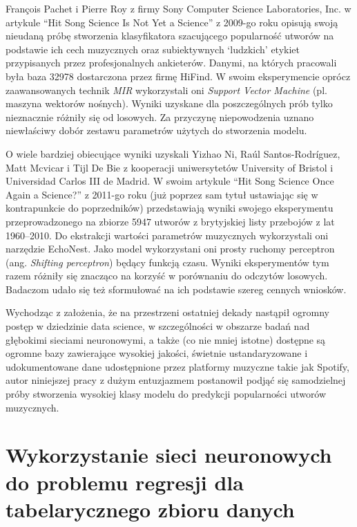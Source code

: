 \documentclass[a4paper,12pt]{article}
\numberwithin{figure}{section}
\begin{document}
    \bigskip

    François Pachet i Pierre Roy z firmy Sony Computer Science Laboratories, Inc. w artykule ``Hit Song Science Is Not Yet a Science'' z 2009-go roku\cite{HitSongScienceNotYet2009} opisują swoją nieudaną próbę stworzenia klasyfikatora szacującego popularność utworów na podstawie ich cech muzycznych oraz subiektywnych `ludzkich' etykiet przypisanych przez profesjonalnych ankieterów. Danymi, na których pracowali była baza 32978 dostarczona przez firmę HiFind. W swoim eksperymencie oprócz zaawansowanych technik \textit{MIR} wykorzystali oni \textit{Support Vector Machine} (pl. maszyna wektorów nośnych). Wyniki uzyskane dla poszczególnych prób tylko nieznacznie różniły się od losowych. Za przyczynę niepowodzenia uznano niewłaściwy dobór zestawu parametrów użytych do stworzenia modelu.

    \bigskip

    O wiele bardziej obiecujące wyniki uzyskali Yizhao Ni, Raúl Santos-Rodríguez, Matt Mcvicar i Tijl De Bie z kooperacji uniwersytetów University of Bristol i Universidad Carlos III de Madrid. W swoim artykule ``Hit Song Science Once Again a Science?'' z 2011-go roku\cite{HitSongScienceOnceAgain2011} (już poprzez sam tytuł ustawiając się w kontrapunkcie do poprzedników) przedstawiają wyniki swojego eksperymentu przeprowadzonego na zbiorze 5947 utworów z brytyjskiej listy przebojów z lat 1960--2010. Do ekstrakcji wartości parametrów muzycznych wykorzystali oni narzędzie EchoNest. Jako model wykorzystani oni prosty ruchomy perceptron (ang. \textit{Shifting perceptron}) będący funkcją czasu. Wyniki eksperymentów tym razem różniły się znacząco na korzyść w porównaniu do odczytów losowych. Badaczom udało się też sformułować na ich podstawie szereg cennych wniosków.

    \bigskip

    Wychodząc z założenia, że na przestrzeni ostatniej dekady nastąpił ogromny postęp w dziedzinie data science, w szczególności w obszarze badań nad głębokimi sieciami neuronowymi, a także (co nie mniej istotne) dostępne są ogromne bazy zawierające wysokiej jakości, świetnie ustandaryzowane i udokumentowane dane udostępnione przez platformy muzyczne takie jak Spotify, autor niniejszej pracy z dużym entuzjazmem postanowił podjąć się samodzielnej próby stworzenia wysokiej klasy modelu do predykcji popularności utworów muzycznych.

    \newpage


    \section{Wykorzystanie sieci neuronowych do problemu regresji dla tabelarycznego zbioru danych}
\end{document}
